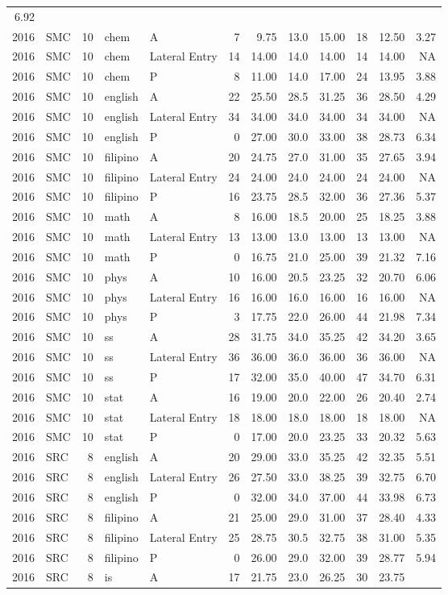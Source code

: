 \documentclass[]{article}
\begin{document}
\begin{longtable}[]{@{}rlrllrrrrrrr@{}}
6.92\tabularnewline
2016 & SMC & 10 & chem & A & 7 & 9.75 & 13.0 & 15.00 & 18 & 12.50 &
3.27\tabularnewline
2016 & SMC & 10 & chem & Lateral Entry & 14 & 14.00 & 14.0 & 14.00 & 14
& 14.00 & NA\tabularnewline
2016 & SMC & 10 & chem & P & 8 & 11.00 & 14.0 & 17.00 & 24 & 13.95 &
3.88\tabularnewline
2016 & SMC & 10 & english & A & 22 & 25.50 & 28.5 & 31.25 & 36 & 28.50 &
4.29\tabularnewline
2016 & SMC & 10 & english & Lateral Entry & 34 & 34.00 & 34.0 & 34.00 &
34 & 34.00 & NA\tabularnewline
2016 & SMC & 10 & english & P & 0 & 27.00 & 30.0 & 33.00 & 38 & 28.73 &
6.34\tabularnewline
2016 & SMC & 10 & filipino & A & 20 & 24.75 & 27.0 & 31.00 & 35 & 27.65
& 3.94\tabularnewline
2016 & SMC & 10 & filipino & Lateral Entry & 24 & 24.00 & 24.0 & 24.00 &
24 & 24.00 & NA\tabularnewline
2016 & SMC & 10 & filipino & P & 16 & 23.75 & 28.5 & 32.00 & 36 & 27.36
& 5.37\tabularnewline
2016 & SMC & 10 & math & A & 8 & 16.00 & 18.5 & 20.00 & 25 & 18.25 &
3.88\tabularnewline
2016 & SMC & 10 & math & Lateral Entry & 13 & 13.00 & 13.0 & 13.00 & 13
& 13.00 & NA\tabularnewline
2016 & SMC & 10 & math & P & 0 & 16.75 & 21.0 & 25.00 & 39 & 21.32 &
7.16\tabularnewline
2016 & SMC & 10 & phys & A & 10 & 16.00 & 20.5 & 23.25 & 32 & 20.70 &
6.06\tabularnewline
2016 & SMC & 10 & phys & Lateral Entry & 16 & 16.00 & 16.0 & 16.00 & 16
& 16.00 & NA\tabularnewline
2016 & SMC & 10 & phys & P & 3 & 17.75 & 22.0 & 26.00 & 44 & 21.98 &
7.34\tabularnewline
2016 & SMC & 10 & ss & A & 28 & 31.75 & 34.0 & 35.25 & 42 & 34.20 &
3.65\tabularnewline
2016 & SMC & 10 & ss & Lateral Entry & 36 & 36.00 & 36.0 & 36.00 & 36 &
36.00 & NA\tabularnewline
2016 & SMC & 10 & ss & P & 17 & 32.00 & 35.0 & 40.00 & 47 & 34.70 &
6.31\tabularnewline
2016 & SMC & 10 & stat & A & 16 & 19.00 & 20.0 & 22.00 & 26 & 20.40 &
2.74\tabularnewline
2016 & SMC & 10 & stat & Lateral Entry & 18 & 18.00 & 18.0 & 18.00 & 18
& 18.00 & NA\tabularnewline
2016 & SMC & 10 & stat & P & 0 & 17.00 & 20.0 & 23.25 & 33 & 20.32 &
5.63\tabularnewline
2016 & SRC & 8 & english & A & 20 & 29.00 & 33.0 & 35.25 & 42 & 32.35 &
5.51\tabularnewline
2016 & SRC & 8 & english & Lateral Entry & 26 & 27.50 & 33.0 & 38.25 &
39 & 32.75 & 6.70\tabularnewline
2016 & SRC & 8 & english & P & 0 & 32.00 & 34.0 & 37.00 & 44 & 33.98 &
6.73\tabularnewline
2016 & SRC & 8 & filipino & A & 21 & 25.00 & 29.0 & 31.00 & 37 & 28.40 &
4.33\tabularnewline
2016 & SRC & 8 & filipino & Lateral Entry & 25 & 28.75 & 30.5 & 32.75 &
38 & 31.00 & 5.35\tabularnewline
2016 & SRC & 8 & filipino & P & 0 & 26.00 & 29.0 & 32.00 & 39 & 28.77 &
5.94\tabularnewline
2016 & SRC & 8 & is & A & 17 & 21.75 & 23.0 & 26.25 & 30 & 23.75 &

\end{longtable}
\end{document}
